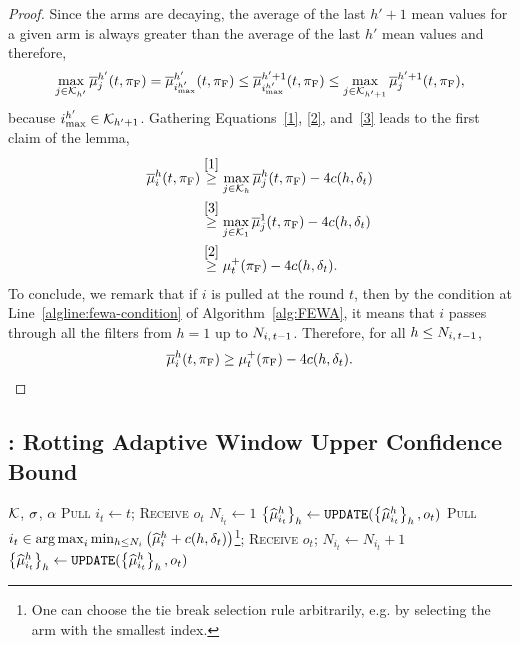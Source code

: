 \begin{proof}
Since the arms are decaying, the average of the last $h' +1$ mean values for a given arm is always greater than the average of the last $h'$ mean values
and therefore, 
\begin{equation}
\label{3}
 \max_{j \in \mathcal{K}_{h'}}\overline{\mu}_j^{h'}(t,\pi_{\rm F}) =   \overline{\mu}_{i^{h'}_{\max}}^{h'}(t,\pi_{\rm F}) \leq \overline{\mu}_{i^{h'}_{\max}}^{h'+1}(t,\pi_{\rm F}) \leq \max_{j \in \mathcal{K}_{h'+1}}\overline{\mu}^{h' +1 }_{j}(t,\pi_{\rm F}), 
\end{equation}
because $i^{h'}_{\rm max} \in \mathcal{K}_{h'+1}$. Gathering Equations~\ref{1}, \ref{2}, and~\ref{3} leads to the first claim of the lemma,
\begin{align*}
\overline{\mu}^{h}_i(t,\pi_{\rm F})
&\stackrel{\eqref{1}}{\geq} \max_{j \in \mathcal{K}_h}\overline{\mu}^{h}_{j}(t,\pi_{\rm F}) - 4c(h, \delta_t)\\
&\stackrel{\eqref{3}}{\geq} \max_{j \in \mathcal{K}_1}\overline{\mu}^{1}_{j}(t,\pi_{\rm F})- 4c(h,  \delta_t)\\
&\stackrel{\eqref{2}}{\geq}  \mu^+_t(\pi_{\rm F}) - 4c(h, \delta_t).
\end{align*}
To conclude, we remark that if $i$ is pulled at the round $t$, then by the condition at Line~\ref{algline:fewa-condition} of Algorithm~\ref{alg:FEWA}, it means that $i$ passes through all the filters from $h=1$ up to $N_{i,\,t-1}$. Therefore, for all $h\leq N_{i,\,t-1}$,
%
\begin{equation}
\overline{\mu}^{h}_i(t,\pi_{\rm F}) \geq  \mu^+_t(\pi_{\rm F}) - 4 c(h, \delta_t).
\end{equation}
\end{proof}

\subsection{{\RUCB}: Rotting Adaptive Window Upper Confidence Bound}
\label{ss:rawucb}

 \begin{minipage}{\textwidth}
\renewcommand*\footnoterule{}
\begin{savenotes}
\begin{algorithm}[H]
\caption{\RUCB}
\label{alg:RAWUCB}
\begin{algorithmic}[1]
\Require $\mathcal{K}$,  $\sigma$, $\alpha$
	\State \textsc{Pull}  $i_t \gets t$; \textsc{Receive} $o_{t}$
	\State $N_{i_t} \gets 1$
	\State $\left\{\widehat{\mu}_{i_t}^h\right\}_h \gets \normalfont \texttt{UPDATE}(\left\{\widehat{\mu}_{i_t}^h\right\}_h, o_t)$ \label{algline:raw-update1}
\EndFor
{}
	\State \textsc{Pull}  $i_t \in \operatorname*{arg\,max}_i \min_{h \leq N_{i}}\left(\widehat{\mu}_i^h + c(h, \delta_t)\right) $\footnote{One can choose the tie break selection rule arbitrarily, e.g. by selecting the arm with the smallest index.}; \textsc{Receive} $o_{t}${\footnotesize {}}; \label{algline:raw-pull}
	\State  $N_{i_t} \gets N_{i_t} +1$
	\State $\left\{\widehat{\mu}_{i_t}^h\right\}_h \gets \normalfont \texttt{UPDATE}(\left\{\widehat{\mu}_{i_t}^h\right\}_h, o_t)$\label{algline:raw-update2}
\EndFor
\end{algorithmic}
\end{algorithm}
\end{savenotes}
\end{minipage}




